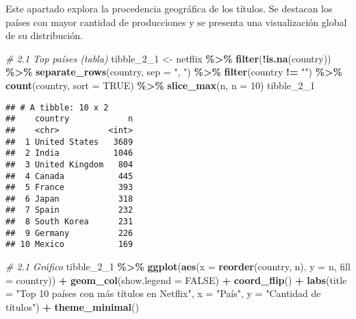 \documentclass[
]{article}
\newenvironment{Shaded}{\begin{snugshade}}{\end{snugshade}}
\newcommand{\AttributeTok}[1]{\textcolor[rgb]{0.13,0.29,0.53}{#1}}
\newcommand{\CommentTok}[1]{\textcolor[rgb]{0.56,0.35,0.01}{\textit{#1}}}
\newcommand{\ConstantTok}[1]{\textcolor[rgb]{0.56,0.35,0.01}{#1}}
\newcommand{\DecValTok}[1]{\textcolor[rgb]{0.00,0.00,0.81}{#1}}
\newcommand{\FunctionTok}[1]{\textcolor[rgb]{0.13,0.29,0.53}{\textbf{#1}}}
\newcommand{\NormalTok}[1]{#1}
\newcommand{\OtherTok}[1]{\textcolor[rgb]{0.56,0.35,0.01}{#1}}
\newcommand{\SpecialCharTok}[1]{\textcolor[rgb]{0.81,0.36,0.00}{\textbf{#1}}}
\newcommand{\StringTok}[1]{\textcolor[rgb]{0.31,0.60,0.02}{#1}}
\begin{document}
Este apartado explora la procedencia geográfica de los títulos. Se
destacan los países con mayor cantidad de producciones y se presenta una
visualización global de su distribución.

\begin{Shaded}
\begin{Highlighting}[]
\CommentTok{\# 2.1 Top países (tabla)}
\NormalTok{tibble\_2\_1 }\OtherTok{\textless{}{-}}\NormalTok{ netflix }\SpecialCharTok{\%\textgreater{}\%}
  \FunctionTok{filter}\NormalTok{(}\SpecialCharTok{!}\FunctionTok{is.na}\NormalTok{(country)) }\SpecialCharTok{\%\textgreater{}\%}
  \FunctionTok{separate\_rows}\NormalTok{(country, }\AttributeTok{sep =} \StringTok{", "}\NormalTok{) }\SpecialCharTok{\%\textgreater{}\%}
  \FunctionTok{filter}\NormalTok{(country }\SpecialCharTok{!=} \StringTok{""}\NormalTok{) }\SpecialCharTok{\%\textgreater{}\%}
  \FunctionTok{count}\NormalTok{(country, }\AttributeTok{sort =} \ConstantTok{TRUE}\NormalTok{) }\SpecialCharTok{\%\textgreater{}\%}
  \FunctionTok{slice\_max}\NormalTok{(n, }\AttributeTok{n =} \DecValTok{10}\NormalTok{)}
\NormalTok{tibble\_2\_1}
\end{Highlighting}
\end{Shaded}

\begin{verbatim}
## # A tibble: 10 x 2
##    country            n
##    <chr>          <int>
##  1 United States   3689
##  2 India           1046
##  3 United Kingdom   804
##  4 Canada           445
##  5 France           393
##  6 Japan            318
##  7 Spain            232
##  8 South Korea      231
##  9 Germany          226
## 10 Mexico           169
\end{verbatim}

\begin{Shaded}
\begin{Highlighting}[]
\CommentTok{\# 2.1 Gráfico}
\NormalTok{tibble\_2\_1 }\SpecialCharTok{\%\textgreater{}\%}
  \FunctionTok{ggplot}\NormalTok{(}\FunctionTok{aes}\NormalTok{(}\AttributeTok{x =} \FunctionTok{reorder}\NormalTok{(country, n), }\AttributeTok{y =}\NormalTok{ n, }\AttributeTok{fill =}\NormalTok{ country)) }\SpecialCharTok{+}
  \FunctionTok{geom\_col}\NormalTok{(}\AttributeTok{show.legend =} \ConstantTok{FALSE}\NormalTok{) }\SpecialCharTok{+}
  \FunctionTok{coord\_flip}\NormalTok{() }\SpecialCharTok{+}
  \FunctionTok{labs}\NormalTok{(}\AttributeTok{title =} \StringTok{"Top 10 países con más títulos en Netflix"}\NormalTok{,}
       \AttributeTok{x =} \StringTok{"País"}\NormalTok{, }\AttributeTok{y =} \StringTok{"Cantidad de títulos"}\NormalTok{) }\SpecialCharTok{+}
  \FunctionTok{theme\_minimal}\NormalTok{()}
\end{Highlighting}
\end{Shaded}
\end{document}
